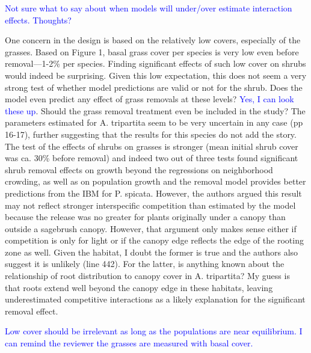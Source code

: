 \documentclass[12pt]{article}
\newcommand{\response}{\textcolor{blue}}
\begin{document}
{\response{Not sure what to say about when models will under/over estimate interaction effects. Thoughts?}

One concern in the design is based on the relatively low covers, especially of the grasses. Based on
Figure 1, basal grass cover per species is very low even before removal—1-2\% per species. Finding
significant effects of such low cover on shrubs would indeed be surprising. Given this low expectation,
this does not seem a very strong test of whether model predictions are valid or not for the shrub. Does
the model even predict any effect of grass removals at these levels? \response{Yes, I can look these up}. Should the grass removal
treatment even be included in the study? The parameters estimated for A. tripartita seem to be very
uncertain in any case (pp 16-17), further suggesting that the results for this species do not add the story.
The test of the effects of shrubs on grasses is stronger (mean initial shrub cover was ca. 30\% before
removal) and indeed two out of three tests found significant shrub removal effects on growth beyond
the regressions on neighborhood crowding, as well as on population growth and the removal model
provides better predictions from the IBM for P. spicata. However, the authors argued this result may
not reflect stronger interspecific competition than estimated by the model because the release was no
greater for plants originally under a canopy than outside a sagebrush canopy. However, that argument
only makes sense either if competition is only for light or if the canopy edge reflects the edge of the
rooting zone as well. Given the habitat, I doubt the former is true and the authors also suggest it is
unlikely (line 442). For the latter, is anything known about the relationship of root distribution to
canopy cover in A. tripartita? My guess is that roots extend well beyond the canopy edge in these
habitats, leaving underestimated competitive interactions as a likely explanation for the significant
removal effect.

\response{Low cover should be irrelevant as long as the populations are near equilibrium. I can remind the reviewer the 
grasses are measured with basal cover.}

}
\end{document}
